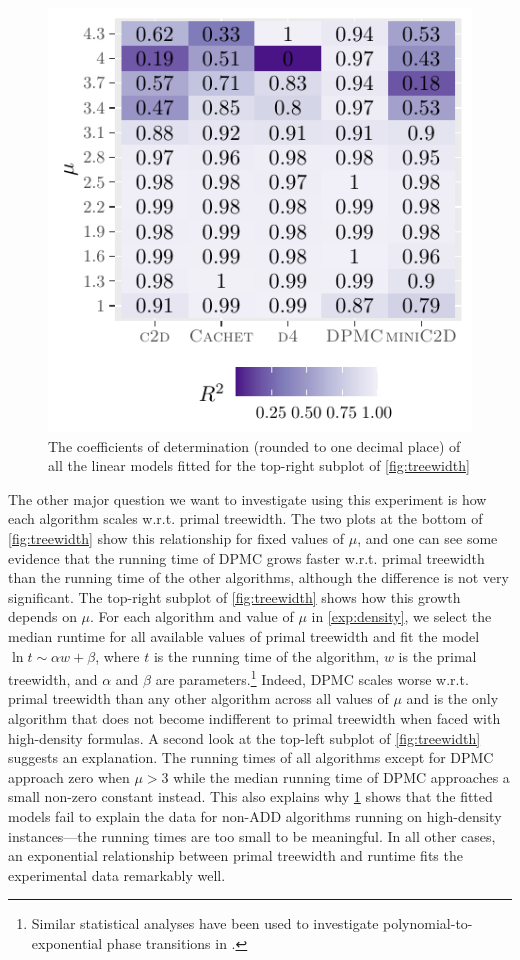 \documentclass{article}
\theoremstyle{definition}
\theoremstyle{remark}
\begin{document}
\begin{figure}
  \centering
  \includegraphics{r2}
  \caption{The coefficients of determination (rounded to one decimal place) of
    all the linear models fitted for the top-right subplot of
    \cref{fig:treewidth}}
  \label{fig:r2}
\end{figure}

The other major question we want to investigate using this experiment is how
each algorithm scales w.r.t. primal treewidth. The two plots at the
bottom of \cref{fig:treewidth} show this relationship for fixed values of $\mu$,
and one can see some evidence that the running time of \textsc{DPMC}
\cite{DBLP:conf/cp/DudekPV20} grows faster w.r.t. primal treewidth than
the running time of the other algorithms, although the difference is not very
significant. The top-right subplot of \cref{fig:treewidth} shows how this growth
depends on $\mu$. For each algorithm and value of $\mu$ in \cref{exp:density},
we select the median runtime for all available values of primal treewidth and
fit the model $\ln t \sim \alpha w + \beta$, where $t$ is the running time of
the algorithm, $w$ is the primal treewidth, and $\alpha$ and $\beta$ are
parameters.\footnote{Similar statistical analyses have been used to investigate
  polynomial-to-exponential phase transitions in \SAT{}
  \cite{DBLP:journals/constraints/CoarfaDASV03}.} Indeed, \textsc{DPMC} scales
worse w.r.t. primal treewidth than any other algorithm across all
values of $\mu$ and is the only algorithm that does not become indifferent to
primal treewidth when faced with high-density formulas. A second look at the
top-left subplot of \cref{fig:treewidth} suggests an explanation. The running
times of all algorithms except for \textsc{DPMC} approach zero when $\mu > 3$
while the median running time of \textsc{DPMC} approaches a small non-zero
constant instead. This also explains why \cref{fig:r2} shows that the fitted
models fail to explain the data for non-ADD algorithms running on high-density
instances---the running times are too small to be meaningful. In all other
cases, an exponential relationship between primal treewidth and runtime fits the
experimental data remarkably well.
\end{document}
